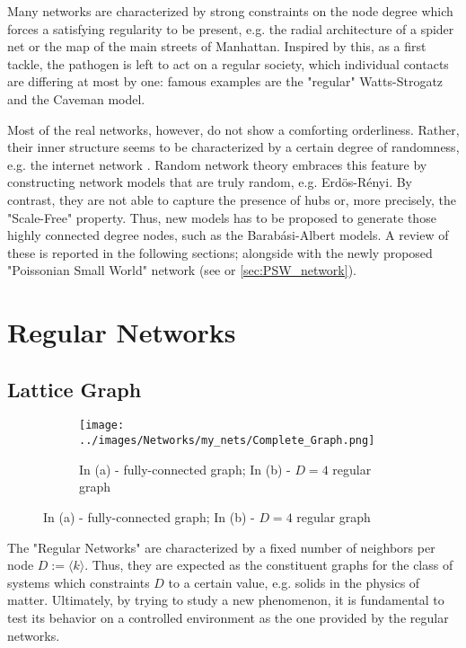 \documentclass[a4paper,10pt, oneside]{book} %
\theoremstyle{definition}
\begin{document}
Many networks are characterized by strong constraints on the node degree which forces a satisfying regularity to be present, e.g. the radial architecture of a spider net or the map of the main streets of Manhattan.
Inspired by this, as a first tackle, the pathogen is left to act on a regular society, which individual contacts are differing at most by one: famous examples are the "regular" Watts-Strogatz and the Caveman model.

Most of the real networks, however, do not show a comforting orderliness. 
Rather, their inner structure seems to be characterized by a certain degree of randomness, e.g. the internet network \cite{barabasi::2016networkbook}. Random network theory embraces this feature by constructing network models that are truly random, e.g. Erdös-Rényi. By contrast, they are not able to capture the presence of hubs or, more precisely, the "Scale-Free" property. Thus, new models has to be proposed to generate those highly connected degree nodes, such as the Barabási-Albert models.
A review of these is reported in the following sections; alongside with the newly proposed "Poissonian Small World" network (see \cite{Thurner::NetBasedExpl} or \autoref{sec:PSW_network}).

\section{Regular Networks}
\label{sec:RLN-Caveman_Description}
\subsection{Lattice Graph}
\begin{figure}[ht]
    \begin{subfigure}{\textwidth}
        \texttt{[image: ../images/Networks/my\_nets/Complete\_Graph.png]}
        \centering
        \caption{In (a) - fully-connected graph; In (b) - $D = 4$ regular graph \cite{Zelazo:2011_RSensNet_images}}
        \label{fig:RegGraph}
    \end{subfigure}
\end{figure}

The "Regular Networks" are characterized by a fixed number of neighbors per node $D := \langle k \rangle$. Thus, they are expected as the constituent graphs for the class of systems which constraints $D$ to a certain value, e.g. solids in the physics of matter.
Ultimately, by trying to study a new phenomenon, it is fundamental to test its behavior on a controlled environment as the one provided by the regular networks.
\end{document}

